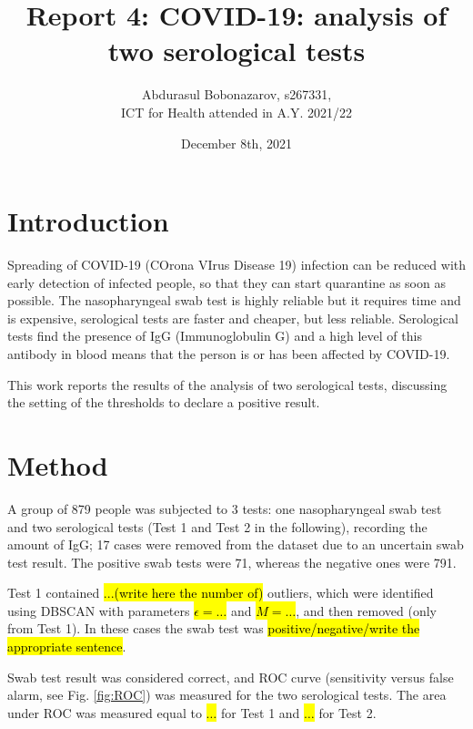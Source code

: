 \documentclass[12pt]{article}
\title{Report 4:
COVID-19: analysis of two serological tests}
\author{Abdurasul Bobonazarov, s267331, \\ICT for Health attended in A.Y. 2021/22}
\date{December 8th, 2021}
\begin{document}
\maketitle
\section{Introduction}
Spreading of COVID-19 (COrona VIrus Disease 19) infection can be reduced with early detection of infected people, so that they can start quarantine as soon as possible.
The nasopharyngeal swab test is highly reliable but it requires time and is expensive, serological tests are faster and cheaper, but less reliable. Serological tests find the presence of IgG (Immunoglobulin G) and a high level of this antibody in blood means that the person is or has been affected by COVID-19.

This work reports the results of the analysis of two serological tests, discussing the setting of the thresholds to declare a positive result.


\section{Method}
A group of 879 people was subjected to 3 tests: one nasopharyngeal swab test and two serological tests (Test 1 and Test 2 in the following), recording the amount of IgG; 17 cases were removed from the dataset due to an uncertain swab test result. The positive swab tests were 71, whereas the negative ones were 791.

Test 1 contained \hl{...(write here the number of)} outliers, which were identified using DBSCAN \cite{DBSCAN} with parameters \hl{$\epsilon=\ldots$} and \hl{$M=\ldots$}, and then removed (only from Test 1). In these cases the swab test was \hl{positive/negative/write the appropriate sentence}.

Swab test result was considered correct, and ROC curve (sensitivity versus false alarm, see Fig.  \ref{fig:ROC}) was measured for the two serological tests. The area under ROC was measured equal to \hl{$\ldots$} for Test 1 and \hl{$\ldots$} for Test 2.
\end{document}

